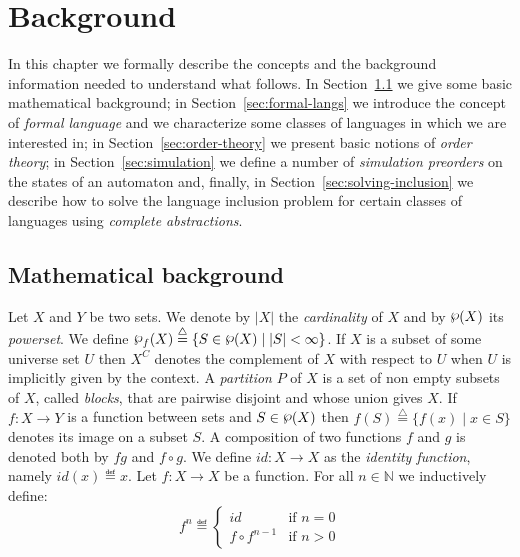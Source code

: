 \chapter{Background}
\label{chap:background}

In this chapter we formally describe the concepts and the background information
needed to understand what follows.
In Section~\ref{sec:math-bg} we give some basic mathematical background;
in Section~\ref{sec:formal-langs} we introduce the concept of \emph{formal language}
and we characterize some classes of languages in which we are interested in;
in Section~\ref{sec:order-theory} we present basic notions of \emph{order theory};
in Section~\ref{sec:simulation} we define a number of \emph{simulation preorders}
on the states of an automaton and, finally,
in Section~\ref{sec:solving-inclusion} we describe how to solve the language
inclusion problem for certain classes of languages using
\emph{complete abstractions}.

\section{Mathematical background}
\label{sec:math-bg}

Let $X$ and $Y$ be two sets.
We denote by $|X|$ the \emph{cardinality} of $X$ and by $\powerset(X)$ its \emph{powerset}.
We define
$\fpowerset(X) \overset{\triangle}{=} \{S \in \powerset(X) \;|\; |S| < \infty\}$.
If $X$ is a subset of some universe set $U$ then $X^C$ denotes the complement of $X$
with respect to $U$ when $U$ is implicitly given by the context.
A \emph{partition} $P$ of $X$ is a set of non empty subsets of $X$, called \emph{blocks},
that are pairwise disjoint and whose union gives $X$.
If $f: X \rightarrow Y$ is a function between sets and $S \in \powerset(X)$ then
$f(S) \overset{\triangle}{=} \{f(x) \;|\; x \in S\}$ denotes its image on a
subset $S$.
A composition of two functions $f$ and $g$ is denoted both by $fg$ and $f \circ g$.
We define $id: X \rightarrow X$ as the \emph{identity function}, namely
$id(x) \eqdef x$.
Let $f: X \rightarrow X$ be a function.
For all $n \in \mathbb{N}$ we inductively define:
\[ f^n \eqdef
\begin{cases}
id & \textrm{if } n = 0\\
f \circ f^{n-1} & \textrm{if } n > 0
\end{cases}\]

